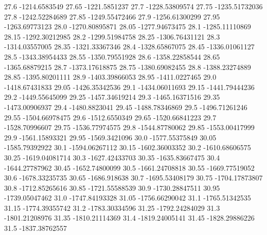            27.6    -1214.6583549
          27.65    -1221.5851237
           27.7   -1228.53809574
          27.75   -1235.51732036
           27.8   -1242.52284689
          27.85   -1249.55472466
           27.9   -1256.61300299
          27.95   -1263.69773123
           28.0   -1270.80895871
          28.05   -1277.94673475
           28.1   -1285.11110869
          28.15   -1292.30212985
           28.2   -1299.51984758
          28.25   -1306.76431121
           28.3   -1314.03557005
          28.35   -1321.33367346
           28.4   -1328.65867075
          28.45   -1336.01061127
           28.5   -1343.38954433
          28.55   -1350.79551928
           28.6   -1358.22858544
          28.65   -1365.68879215
           28.7   -1373.17618875
          28.75   -1380.69082455
           28.8   -1388.23274889
          28.85   -1395.80201111
           28.9   -1403.39866053
          28.95    -1411.0227465
           29.0   -1418.67431833
          29.05   -1426.35342536
           29.1   -1434.06011693
          29.15   -1441.79444236
           29.2   -1449.55645099
          29.25   -1457.34619214
           29.3   -1465.16371516
          29.35   -1473.00906937
           29.4    -1480.8823041
          29.45   -1488.78346869
           29.5   -1496.71261246
          29.55   -1504.66978475
           29.6    -1512.6550349
          29.65   -1520.66841223
           29.7   -1528.70996607
          29.75   -1536.77974575
           29.8   -1544.87780062
          29.85   -1553.00417999
           29.9   -1561.15893321
          29.95    -1569.3421096
           30.0   -1577.55375849
          30.05   -1585.79392922
           30.1   -1594.06267112
          30.15   -1602.36003352
           30.2   -1610.68606575
          30.25   -1619.04081714
           30.3   -1627.42433703
          30.35   -1635.83667475
           30.4   -1644.27787962
          30.45   -1652.74800099
           30.5   -1661.24708818
          30.55   -1669.77519052
           30.6   -1678.33235735
          30.65     -1686.918638
           30.7   -1695.53408179
          30.75   -1704.17873807
           30.8   -1712.85265616
          30.85   -1721.55588539
           30.9   -1730.28847511
          30.95   -1739.05047462
           31.0   -1747.84193328
          31.05   -1756.66290042
           31.1   -1765.51342535
          31.15   -1774.39355742
           31.2   -1783.30334596
          31.25   -1792.24284029
           31.3   -1801.21208976
          31.35   -1810.21114369
           31.4   -1819.24005141
          31.45   -1828.29886226
           31.5   -1837.38762557
